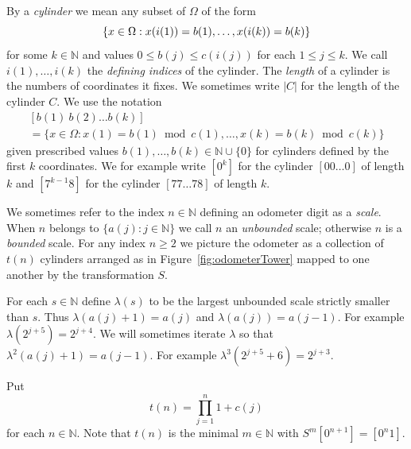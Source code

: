 \documentclass[AHL,Unicode,longabstracts,published]{cedram}
\newcommand{\N}{\mathbb{N}}
\let\originalleft\left
\let\originalright\right
\renewcommand{\left}{\mathopen{}\mathclose\bgroup\originalleft}
\renewcommand{\right}{\aftergroup\egroup\originalright}
\begin{document}
By a
\emph{cylinder} we mean any subset of $\Omega$ of the form
\[
\left\{ x \in \Omega : x(i(1)) = b(1),\dots,x(i(k)) = b(k) \right\}
\]
for some $k \in \N$ and values $0 \le b(j) \le c(i(j))$ for each $1 \le j \le k$. We call $i(1),\dots,i(k)$ the
\emph{defining indices} of the cylinder. The
\emph{length} of a cylinder is the numbers of coordinates it fixes. We sometimes write $|C|$ for the length of the cylinder $C$. We use the notation
%
\begin{multline}\label{eqn:cylinder}
[b(1)\ b(2) \dots b(k)]\\
=
\{ x \in \Omega : x(1) = b(1) \bmod c(1),\dots,x(k) = b(k) \bmod c(k) \}
\end{multline}
given prescribed values $b(1), \dots, b(k) \in \N \cup \{0\}$ for cylinders defined by the first $k$ coordinates. We for example write $[0^k]$ for the cylinder $[00\dots 0]$ of length $k$ and $[7^{k-1} 8]$ for the cylinder $[77\dots 78]$ of length $k$.

We sometimes refer to the index $n \in \N$ defining an odometer digit as a
\emph{scale}. When $n$ belongs to $\{ a(j) : j \in \N \}$ we call $n$ an
\emph{unbounded} scale; otherwise $n$ is a
\emph{bounded} scale. For any index $n \ge 2$ we picture the odometer as a collection of $t(n)$ cylinders arranged as in Figure~\ref{fig:odometerTower} mapped to one another by the transformation $S$.

For each $s \in \N$ define $\lambda(s)$ to be the largest unbounded scale strictly smaller than $s$. Thus $\lambda(a(j)+1) = a(j)$ and $\lambda(a(j)) = a(j-1)$. For example $\lambda(2^{j+5}) = 2^{j+4}$. We will sometimes iterate $\lambda$ so that $\lambda^2(a(j)+1) = a(j-1)$. For example $\lambda^3(2^{j+5} + 6) = 2^{j+3}$.


Put
\[
t(n) = \prod_{j=1}^n 1 + c(j)
\]
for each $n \in \N$. Note that $t(n)$ is the minimal $m \in \N$ with $S^m[0^{n+1}]=[0^n 1]$.
\end{document}
